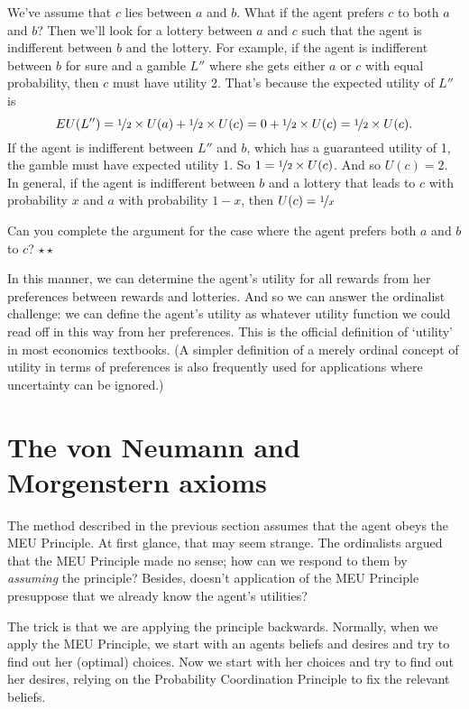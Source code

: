 We've assume that $c$ lies between $a$ and $b$. What if the agent
prefers $c$ to both $a$ and $b$? Then we'll look for a lottery between
$a$ and $c$ such that the agent is indifferent between $b$ and the
lottery. For example, if the agent is indifferent between $b$ for sure
and a gamble $L''$ where she gets either $a$ or $c$ with equal
probability, then $c$ must have utility 2. That's because the expected
utility of $L''$ is
\[
  EU(L'') = \nicefrac{1}{2} \times U(a) + \nicefrac{1}{2} \times U(c) =  
   0 + \nicefrac{1}{2} \times U(c) = \nicefrac{1}{2} \times U(c). 
\]
If the agent is indifferent between $L''$ and $b$, which has a
guaranteed utility of 1, the gamble must have expected utility 1. So
$1 = \nicefrac{1}{2} \times U(c)$. And so $U(c) = 2$. In general, if
the agent is indifferent between $b$ and a lottery that leads to $c$
with probability $x$ and $a$ with probability $1-x$, then $U(c) =
\nicefrac{1}{x}$


\begin{exercise}
  Can you complete the argument for the case where the agent prefers
  both $a$ and $b$ to $c$? $\star\star$
\end{exercise}

In this manner, we can determine the agent's utility for all rewards
from her preferences between rewards and lotteries. And so we can
answer the ordinalist challenge: we can define the agent's utility as
whatever utility function we could read off in this way from her
preferences. This is the official definition of `utility' in most
economics textbooks. (A simpler definition of a merely ordinal concept
of utility in terms of preferences is also frequently used for
applications where uncertainty can be ignored.)

\section{The von Neumann and Morgenstern axioms}\label{sec:vnm}

The method described in the previous section assumes that the agent
obeys the MEU Principle. At first glance, that may seem strange. The
ordinalists argued that the MEU Principle made no sense; how can we
respond to them by \emph{assuming} the principle? Besides, doesn't
application of the MEU Principle presuppose that we already know the
agent's utilities?

The trick is that we are applying the principle backwards. Normally,
when we apply the MEU Principle, we start with an agents beliefs and
desires and try to find out her (optimal) choices. Now we start with her
choices and try to find out her desires, relying on the Probability
Coordination Principle to fix the relevant beliefs.

